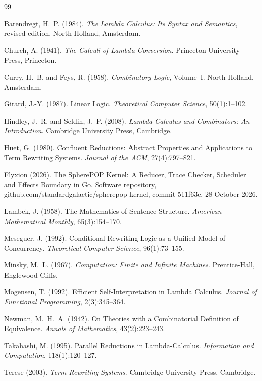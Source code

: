 \documentclass[11pt]{article}
\theoremstyle{definition}
\theoremstyle{remark}
\begin{document}
\begin{thebibliography}{99}
\setlength{\itemsep}{2pt}

Barendregt, H.~P. (1984).
\newblock \emph{The Lambda Calculus: Its Syntax and Semantics}, revised edition.
\newblock North-Holland, Amsterdam.

Church, A. (1941).
\newblock \emph{The Calculi of Lambda-Conversion}.
\newblock Princeton University Press, Princeton.

Curry, H.~B. and Feys, R. (1958).
\newblock \emph{Combinatory Logic}, Volume~I.
\newblock North-Holland, Amsterdam.

Girard, J.-Y. (1987).
\newblock Linear Logic.
\newblock \emph{Theoretical Computer Science}, 50(1):1--102.

Hindley, J.~R. and Seldin, J.~P. (2008).
\newblock \emph{Lambda-Calculus and Combinators: An Introduction}.
\newblock Cambridge University Press, Cambridge.

Huet, G. (1980).
\newblock Confluent Reductions: Abstract Properties and Applications to Term Rewriting Systems.
\newblock \emph{Journal of the ACM}, 27(4):797--821.

Flyxion (2026).
\newblock The SpherePOP Kernel: A Reducer, Trace Checker, Scheduler and Effects Boundary in Go.
\newblock Software repository, github.com/standardgalactic/spherepop-kernel, commit 511f63e, 28 October 2026.

Lambek, J. (1958).
\newblock The Mathematics of Sentence Structure.
\newblock \emph{American Mathematical Monthly}, 65(3):154--170.

Meseguer, J. (1992).
\newblock Conditional Rewriting Logic as a Unified Model of Concurrency.
\newblock \emph{Theoretical Computer Science}, 96(1):73--155.

Minsky, M.~L. (1967).
\newblock \emph{Computation: Finite and Infinite Machines}.
\newblock Prentice-Hall, Englewood Cliffs.

Mogensen, T. (1992).
\newblock Efficient Self-Interpretation in Lambda Calculus.
\newblock \emph{Journal of Functional Programming}, 2(3):345--364.

Newman, M.~H.~A. (1942).
\newblock On Theories with a Combinatorial Definition of Equivalence.
\newblock \emph{Annals of Mathematics}, 43(2):223--243.

Takahashi, M. (1995).
\newblock Parallel Reductions in Lambda-Calculus.
\newblock \emph{Information and Computation}, 118(1):120--127.

Terese (2003).
\newblock \emph{Term Rewriting Systems}.
\newblock Cambridge University Press, Cambridge.

\end{thebibliography}
\end{document}
